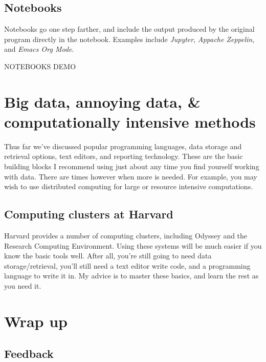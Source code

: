 \documentclass[]{book}
\begin{document}
\hypertarget{notebooks}{%
\subsection{Notebooks}\label{notebooks}}

Notebooks go one step farther, and include the output produced by the original program directly in the notebook. Examples include \emph{Jupyter}, \emph{Appache Zeppelin}, and \emph{Emacs Org Mode}.

NOTEBOOKS DEMO

\hypertarget{big-data-annoying-data-computationally-intensive-methods}{%
\section{Big data, annoying data, \& computationally intensive methods}\label{big-data-annoying-data-computationally-intensive-methods}}

Thus far we've discussed popular programming languages, data storage and retrieval options, text editors, and reporting technology. These are the basic building blocks I recommend using just about any time you find yourself working with data. There are times however when more is needed. For example, you may wish to use distributed computing for large or resource intensive computations.

\hypertarget{computing-clusters-at-harvard}{%
\subsection{Computing clusters at Harvard}\label{computing-clusters-at-harvard}}

Harvard provides a number of computing clusters, including Odyssey and the Research Computing Environment. Using these systems will be much easier if you know the basic tools well. After all, you're still going to need data storage/retrieval, you'll still need a text editor write code, and a programming language to write it in. My advice is to master these basics, and learn the rest as you need it.

\hypertarget{wrap-up}{%
\section{Wrap up}\label{wrap-up}}

\hypertarget{feedback}{%
\subsection{Feedback}\label{feedback}}
\end{document}
